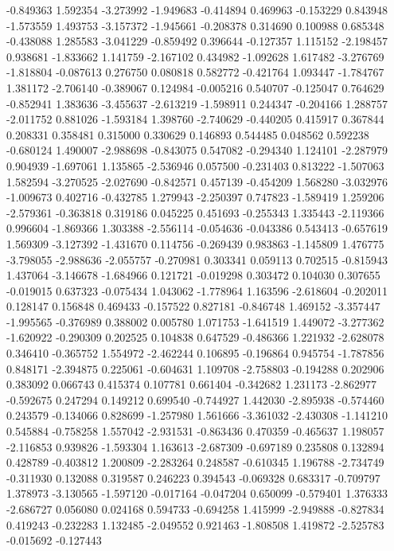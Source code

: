-0.849363
1.592354
-3.273992
-1.949683
-0.414894
0.469963
-0.153229
0.843948
-1.573559
1.493753
-3.157372
-1.945661
-0.208378
0.314690
0.100988
0.685348
-0.438088
1.285583
-3.041229
-0.859492
0.396644
-0.127357
1.115152
-2.198457
0.938681
-1.833662
1.141759
-2.167102
0.434982
-1.092628
1.617482
-3.276769
-1.818804
-0.087613
0.276750
0.080818
0.582772
-0.421764
1.093447
-1.784767
1.381172
-2.706140
-0.389067
0.124984
-0.005216
0.540707
-0.125047
0.764629
-0.852941
1.383636
-3.455637
-2.613219
-1.598911
0.244347
-0.204166
1.288757
-2.011752
0.881026
-1.593184
1.398760
-2.740629
-0.440205
0.415917
0.367844
0.208331
0.358481
0.315000
0.330629
0.146893
0.544485
0.048562
0.592238
-0.680124
1.490007
-2.988698
-0.843075
0.547082
-0.294340
1.124101
-2.287979
0.904939
-1.697061
1.135865
-2.536946
0.057500
-0.231403
0.813222
-1.507063
1.582594
-3.270525
-2.027690
-0.842571
0.457139
-0.454209
1.568280
-3.032976
-1.009673
0.402716
-0.432785
1.279943
-2.250397
0.747823
-1.589419
1.259206
-2.579361
-0.363818
0.319186
0.045225
0.451693
-0.255343
1.335443
-2.119366
0.996604
-1.869366
1.303388
-2.556114
-0.054636
-0.043386
0.543413
-0.657619
1.569309
-3.127392
-1.431670
0.114756
-0.269439
0.983863
-1.145809
1.476775
-3.798055
-2.988636
-2.055757
-0.270981
0.303341
0.059113
0.702515
-0.815943
1.437064
-3.146678
-1.684966
0.121721
-0.019298
0.303472
0.104030
0.307655
-0.019015
0.637323
-0.075434
1.043062
-1.778964
1.163596
-2.618604
-0.202011
0.128147
0.156848
0.469433
-0.157522
0.827181
-0.846748
1.469152
-3.357447
-1.995565
-0.376989
0.388002
0.005780
1.071753
-1.641519
1.449072
-3.277362
-1.620922
-0.290309
0.202525
0.104838
0.647529
-0.486366
1.221932
-2.628078
0.346410
-0.365752
1.554972
-2.462244
0.106895
-0.196864
0.945754
-1.787856
0.848171
-2.394875
0.225061
-0.604631
1.109708
-2.758803
-0.194288
0.202906
0.383092
0.066743
0.415374
0.107781
0.661404
-0.342682
1.231173
-2.862977
-0.592675
0.247294
0.149212
0.699540
-0.744927
1.442030
-2.895938
-0.574460
0.243579
-0.134066
0.828699
-1.257980
1.561666
-3.361032
-2.430308
-1.141210
0.545884
-0.758258
1.557042
-2.931531
-0.863436
0.470359
-0.465637
1.198057
-2.116853
0.939826
-1.593304
1.163613
-2.687309
-0.697189
0.235808
0.132894
0.428789
-0.403812
1.200809
-2.283264
0.248587
-0.610345
1.196788
-2.734749
-0.311930
0.132088
0.319587
0.246223
0.394543
-0.069328
0.683317
-0.709797
1.378973
-3.130565
-1.597120
-0.017164
-0.047204
0.650099
-0.579401
1.376333
-2.686727
0.056080
0.024168
0.594733
-0.694258
1.415999
-2.949888
-0.827834
0.419243
-0.232283
1.132485
-2.049552
0.921463
-1.808508
1.419872
-2.525783
-0.015692
-0.127443

